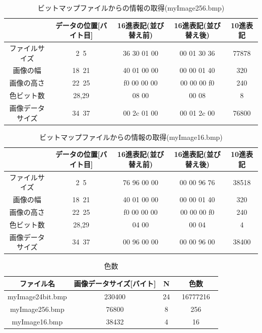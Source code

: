 \documentclass[uplatex, titlepage]{jsarticle}
\begin{document}
\begin{table}[H]
  \centering
  \caption{ビットマップファイルからの情報の取得(myImage256.bmp)}
  \label{table:zyoho256}
  \begin{tabular}{|c|c|c|c|c|}\hline
     & データの位置[バイト目] & 16進表記(並び替え前) & 16進表記(並び替え後) & 10進表記 \\ \hline
     ファイルサイズ & 2~5 & 36 30 01 00 & 00 01 30 36 & 77878 \\ \hline
     画像の幅 & 18~21 & 40 01 00 00 & 00 00 01 40 & 320 \\ \hline
     画像の高さ & 22~25 & f0 00 00 00 & 00 00 00 f0 & 240 \\ \hline
     色ビット数 & 28,29 & 08 00 & 00 08 & 8 \\ \hline
     画像データサイズ & 34~37 & 00 2c 01 00 & 00 01 2c 00 & 76800 \\ \hline
  \end{tabular}
\end{table}

\begin{table}[H]
  \centering
  \caption{ビットマップファイルからの情報の取得(myImage16.bmp)}
  \label{table:zyoho16}
  \begin{tabular}{|c|c|c|c|c|}\hline
     & データの位置[バイト目] & 16進表記(並び替え前) & 16進表記(並び替え後) & 10進表記 \\ \hline
     ファイルサイズ & 2~5 & 76 96 00 00 & 00 00 96 76 & 38518 \\ \hline
     画像の幅 & 18~21 & 40 01 00 00 & 00 00 01 40 & 320 \\ \hline
     画像の高さ & 22~25 & f0 00 00 00 & 00 00 00 f0 & 240 \\ \hline
     色ビット数 & 28,29 & 04 00 & 00 04 & 4 \\ \hline
     画像データサイズ & 34~37 & 00 96 00 00 & 00 00 96 00 & 38400 \\ \hline
  \end{tabular}
\end{table}

\begin{table}[H]
  \centering
  \caption{色数}
  \label{table:irokazu}
  \begin{tabular}{|c|c|c|c|}\hline
    ファイル名 & 画像データサイズ[バイト] & N & 色数 \\ \hline
    myImage24bit.bmp & 230400 & 24 & 16777216 　 \\ \hline
    myImage256.bmp & 76800 & 8 & 256 \\ \hline
    myImage16.bmp & 38432 & 4 & 16 \\ \hline
  \end{tabular}
\end{table}
\end{document}
